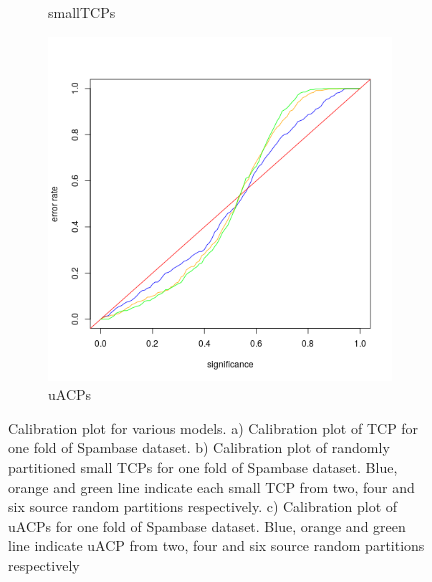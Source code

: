 \documentclass[main]{subfiles}
\begin{document}
\begin{figure}[H]
\begin{center}
\begin{subfigure}{.3\textwidth}
  \caption{smallTCPs}\label{fig:valIndividual}
  \end{subfigure}
  \begin{subfigure}{.3\textwidth}
  \centering
  \includegraphics[scale=0.2]{images/eqSourceCombined}
  \caption{uACPs}\label{fig:valCombined}
  \end{subfigure}
  
 \caption{Calibration plot for various models. a) Calibration plot of TCP for one fold of Spambase dataset. b) Calibration plot of randomly partitioned small TCPs for one fold of  Spambase dataset. Blue, orange and  green line indicate each small TCP from two, four and six source random partitions respectively. c) Calibration plot of uACPs for one fold of Spambase dataset. Blue, orange and  green line indicate uACP from two, four and six source random partitions respectively}
 
\end{center}
\end{figure}


\end{document}
